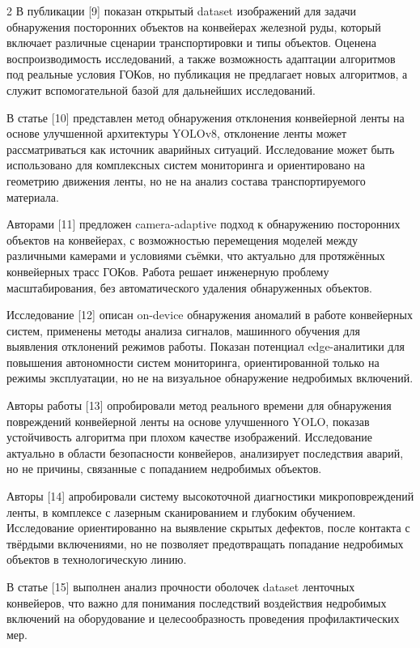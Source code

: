 \begin{multicols}{2}
В публикации {[}9{]} показан открытый dataset изображений для задачи
обнаружения посторонних объектов на конвейерах железной руды, который
включает различные сценарии транспортировки и типы объектов. Оценена
воспроизводимость исследований, а также возможность адаптации алгоритмов
под реальные условия ГОКов, но публикация не предлагает новых
алгоритмов, а служит вспомогательной базой для дальнейших исследований.

В статье {[}10{]} представлен метод обнаружения отклонения конвейерной
ленты на основе улучшенной архитектуры YOLOv8, отклонение ленты может
рассматриваться как источник аварийных ситуаций. Исследование может быть
использовано для комплексных систем мониторинга и ориентировано на
геометрию движения ленты, но не на анализ состава транспортируемого
материала.

Авторами {[}11{]} предложен camera-adaptive подход к обнаружению
посторонних объектов на конвейерах, с возможностью перемещения моделей
между различными камерами и условиями съёмки, что актуально для
протяжённых конвейерных трасс ГОКов. Работа решает инженерную проблему
масштабирования, без автоматического удаления обнаруженных объектов.

Исследование {[}12{]} описан on-device обнаружения аномалий в работе
конвейерных систем, применены методы анализа сигналов, машинного
обучения для выявления отклонений режимов работы. Показан потенциал
edge-аналитики для повышения автономности систем мониторинга,
ориентированной только на режимы эксплуатации, но не на визуальное
обнаружение недробимых включений.

Авторы работы {[}13{]} опробировали метод реального времени для
обнаружения повреждений конвейерной ленты на основе улучшенного YOLO,
показав устойчивость алгоритма при плохом качестве изображений.
Исследование актуально в области безопасности конвейеров, анализирует
последствия аварий, но не причины, связанные с попаданием недробимых
объектов.

Авторы {[}14{]} апробировали систему высокоточной диагностики
микроповреждений ленты, в комплексе с лазерным сканированием и глубоким
обучением. Исследование ориентированно на выявление скрытых дефектов,
после контакта с твёрдыми включениями, но не позволяет предотвращать
попадание недробимых объектов в технологическую линию.

В статье {[}15{]} выполнен анализ прочности оболочек dataset ленточных
конвейеров, что важно для понимания последствий воздействия недробимых
включений на оборудование и целесообразность проведения профилактических
мер.


\end{multicols}
